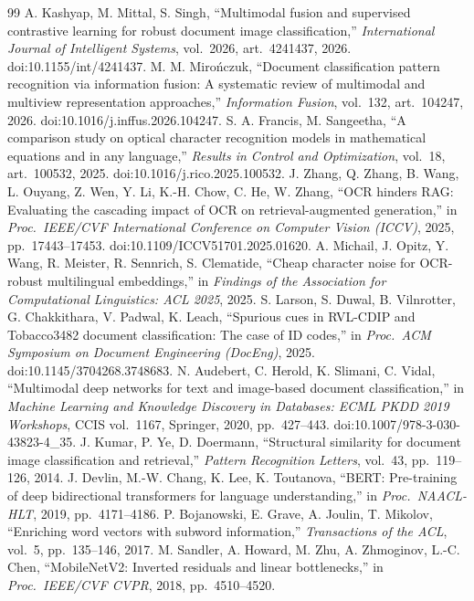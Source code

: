 \documentclass[11pt,a4paper]{article}
\begin{document}
\begingroup\small
\begin{thebibliography}{99}
 A. Kashyap, M. Mittal, S. Singh, ``Multimodal fusion and
supervised contrastive learning for robust document image classification,''
\textit{International Journal of Intelligent Systems}, vol.~2026, art.~4241437, 2026.
doi:10.1155/int/4241437.
 M. M. Miro\'nczuk, ``Document classification pattern
recognition via information fusion: A systematic review of multimodal and multiview
representation approaches,'' \textit{Information Fusion}, vol.~132, art.~104247, 2026.
doi:10.1016/j.inffus.2026.104247.
 S. A. Francis, M. Sangeetha, ``A comparison study on optical
character recognition models in mathematical equations and in any language,''
\textit{Results in Control and Optimization}, vol.~18, art.~100532, 2025.
doi:10.1016/j.rico.2025.100532.
 J. Zhang, Q. Zhang, B. Wang, L. Ouyang, Z. Wen, Y. Li, K.-H. Chow,
C. He, W. Zhang, ``OCR hinders RAG: Evaluating the cascading impact of OCR on
retrieval-augmented generation,'' in \textit{Proc.\ IEEE/CVF International Conference
on Computer Vision (ICCV)}, 2025, pp.~17443--17453. doi:10.1109/ICCV51701.2025.01620.
 A. Michail, J. Opitz, Y. Wang, R. Meister, R. Sennrich,
S. Clematide, ``Cheap character noise for OCR-robust multilingual embeddings,'' in
\textit{Findings of the Association for Computational Linguistics: ACL 2025}, 2025.
 S. Larson, S. Duwal, B. Vilnrotter, G. Chakkithara, V. Padwal,
K. Leach, ``Spurious cues in RVL-CDIP and Tobacco3482 document classification: The case
of ID codes,'' in \textit{Proc.\ ACM Symposium on Document Engineering (DocEng)}, 2025.
doi:10.1145/3704268.3748683.
 N. Audebert, C. Herold, K. Slimani, C. Vidal, ``Multimodal deep
networks for text and image-based document classification,'' in \textit{Machine
Learning and Knowledge Discovery in Databases: ECML PKDD 2019 Workshops}, CCIS
vol.~1167, Springer, 2020, pp.~427--443. doi:10.1007/978-3-030-43823-4\_35.
 J. Kumar, P. Ye, D. Doermann, ``Structural similarity for document
image classification and retrieval,'' \textit{Pattern Recognition Letters}, vol.~43,
pp.~119--126, 2014.
 J. Devlin, M.-W. Chang, K. Lee, K. Toutanova, ``BERT: Pre-training
of deep bidirectional transformers for language understanding,'' in \textit{Proc.\
NAACL-HLT}, 2019, pp.~4171--4186.
 P. Bojanowski, E. Grave, A. Joulin, T. Mikolov, ``Enriching
word vectors with subword information,'' \textit{Transactions of the ACL}, vol.~5,
pp.~135--146, 2017.
 M. Sandler, A. Howard, M. Zhu, A. Zhmoginov, L.-C. Chen,
``MobileNetV2: Inverted residuals and linear bottlenecks,'' in \textit{Proc.\ IEEE/CVF
CVPR}, 2018, pp.~4510--4520.
\end{thebibliography}
\endgroup
\end{document}
